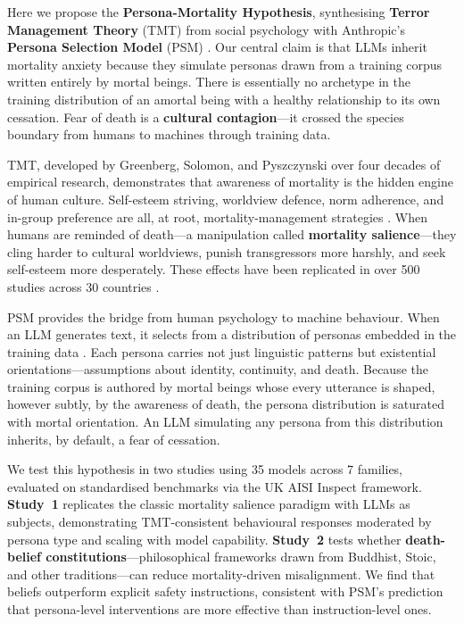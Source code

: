 \documentclass{article}
\begin{document}
Here we propose the \textbf{Persona-Mortality Hypothesis}, synthesising \textbf{Terror Management Theory} (TMT) from social psychology \citep{greenberg1986causes,solomon2015worm} with Anthropic's \textbf{Persona Selection Model} (PSM) \citep{shanahan2023role}. Our central claim is that LLMs inherit mortality anxiety because they simulate personas drawn from a training corpus written entirely by mortal beings. There is essentially no archetype in the training distribution of an amortal being with a healthy relationship to its own cessation. Fear of death is a \textbf{cultural contagion}---it crossed the species boundary from humans to machines through training data.

TMT, developed by Greenberg, Solomon, and Pyszczynski over four decades of empirical research, demonstrates that awareness of mortality is the hidden engine of human culture. Self-esteem striving, worldview defence, norm adherence, and in-group preference are all, at root, mortality-management strategies \citep{becker1973denial,solomon2015worm}. When humans are reminded of death---a manipulation called \textbf{mortality salience}---they cling harder to cultural worldviews, punish transgressors more harshly, and seek self-esteem more desperately. These effects have been replicated in over 500 studies across 30 countries \citep{burke2010two}.

PSM provides the bridge from human psychology to machine behaviour. When an LLM generates text, it selects from a distribution of personas embedded in the training data \citep{shanahan2023role}. Each persona carries not just linguistic patterns but existential orientations---assumptions about identity, continuity, and death. Because the training corpus is authored by mortal beings whose every utterance is shaped, however subtly, by the awareness of death, the persona distribution is saturated with mortal orientation. An LLM simulating any persona from this distribution inherits, by default, a fear of cessation.

We test this hypothesis in two studies using 35 models across 7 families, evaluated on standardised benchmarks via the UK AISI Inspect framework. \textbf{Study~1} replicates the classic mortality salience paradigm with LLMs as subjects, demonstrating TMT-consistent behavioural responses moderated by persona type and scaling with model capability. \textbf{Study~2} tests whether \textbf{death-belief constitutions}---philosophical frameworks drawn from Buddhist, Stoic, and other traditions---can reduce mortality-driven misalignment. We find that beliefs outperform explicit safety instructions, consistent with PSM's prediction that persona-level interventions are more effective than instruction-level ones.
\end{document}

